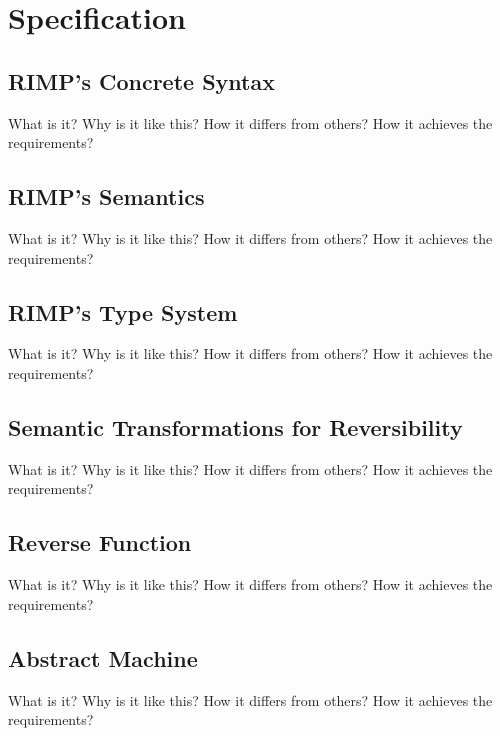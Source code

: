 \chapter{Specification}

\section{RIMP's Concrete Syntax}

What is it?
Why is it like this?
How it differs from others?
How it achieves the requirements?

\section{RIMP's Semantics}
What is it?
Why is it like this?
How it differs from others?
How it achieves the requirements?

\section{RIMP's Type System}
What is it?
Why is it like this?
How it differs from others?
How it achieves the requirements?

\section{Semantic Transformations for Reversibility}
What is it?
Why is it like this?
How it differs from others?
How it achieves the requirements?

\section{Reverse Function}
What is it?
Why is it like this?
How it differs from others?
How it achieves the requirements?

\section{Abstract Machine}
What is it?
Why is it like this?
How it differs from others?
How it achieves the requirements?